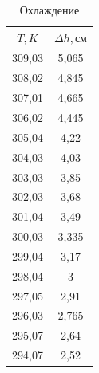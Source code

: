 \documentclass[a4paper,12pt]{article}
\begin{document}
\begin{table}[h]
    \centering
    \begin{tabular}{|c|c|} \hline
    $T, K$ & $\Delta h, см$ \\ \hline
         309,03 & 5,065 \\ \hline
         308,02 & 4,845\\ \hline
         307,01 & 4,665\\ \hline
         306,02 & 4,445\\ \hline
         305,04 & 4,22\\ \hline
         304,03 & 4,03\\ \hline
         303,03 & 3,85\\ \hline
         302,03 & 3,68\\ \hline
         301,04 & 3,49\\ \hline
         300,03 & 3,335\\ \hline
         299,04 & 3,17\\ \hline
         298,04 & 3\\ \hline
         297,05 & 2,91\\ \hline
         296,03 & 2,765\\ \hline
         295,07 & 2,64\\ \hline
         294,07 & 2,52\\ \hline
    \end{tabular}
    \caption{Охлаждение}
    \label{tab:my_label}
\end{table}
\end{document}
